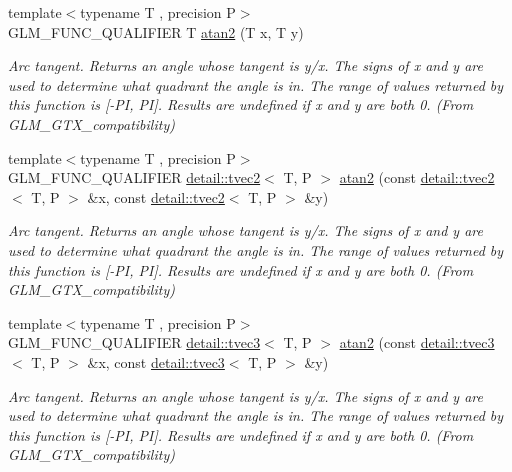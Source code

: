 \begin{DoxyCompactItemize}
{\footnotesize template$<$typename T , precision P$>$ }\\G\+L\+M\+\_\+\+F\+U\+N\+C\+\_\+\+Q\+U\+A\+L\+I\+F\+I\+ER T \hyperlink{group__gtx__compatibility_gac63011205bf6d0be82589dc56dd26708}{atan2} (T x, T y)
\begin{DoxyCompactList}\small\item\em Arc tangent. Returns an angle whose tangent is y/x. The signs of x and y are used to determine what quadrant the angle is in. The range of values returned by this function is \mbox{[}-\/\+PI, PI\mbox{]}. Results are undefined if x and y are both 0. (From G\+L\+M\+\_\+\+G\+T\+X\+\_\+compatibility) \end{DoxyCompactList}\item 
{\footnotesize template$<$typename T , precision P$>$ }\\G\+L\+M\+\_\+\+F\+U\+N\+C\+\_\+\+Q\+U\+A\+L\+I\+F\+I\+ER \hyperlink{structglm_1_1detail_1_1tvec2}{detail\+::tvec2}$<$ T, P $>$ \hyperlink{group__gtx__compatibility_ga9947ea1e628e2823b9276924445e0147}{atan2} (const \hyperlink{structglm_1_1detail_1_1tvec2}{detail\+::tvec2}$<$ T, P $>$ \&x, const \hyperlink{structglm_1_1detail_1_1tvec2}{detail\+::tvec2}$<$ T, P $>$ \&y)
\begin{DoxyCompactList}\small\item\em Arc tangent. Returns an angle whose tangent is y/x. The signs of x and y are used to determine what quadrant the angle is in. The range of values returned by this function is \mbox{[}-\/\+PI, PI\mbox{]}. Results are undefined if x and y are both 0. (From G\+L\+M\+\_\+\+G\+T\+X\+\_\+compatibility) \end{DoxyCompactList}\item 
{\footnotesize template$<$typename T , precision P$>$ }\\G\+L\+M\+\_\+\+F\+U\+N\+C\+\_\+\+Q\+U\+A\+L\+I\+F\+I\+ER \hyperlink{structglm_1_1detail_1_1tvec3}{detail\+::tvec3}$<$ T, P $>$ \hyperlink{group__gtx__compatibility_gac457f8819be9cd8e3f42be17451b750a}{atan2} (const \hyperlink{structglm_1_1detail_1_1tvec3}{detail\+::tvec3}$<$ T, P $>$ \&x, const \hyperlink{structglm_1_1detail_1_1tvec3}{detail\+::tvec3}$<$ T, P $>$ \&y)
\begin{DoxyCompactList}\small\item\em Arc tangent. Returns an angle whose tangent is y/x. The signs of x and y are used to determine what quadrant the angle is in. The range of values returned by this function is \mbox{[}-\/\+PI, PI\mbox{]}. Results are undefined if x and y are both 0. (From G\+L\+M\+\_\+\+G\+T\+X\+\_\+compatibility) \end{DoxyCompactList}\item 

\end{DoxyCompactItemize}
